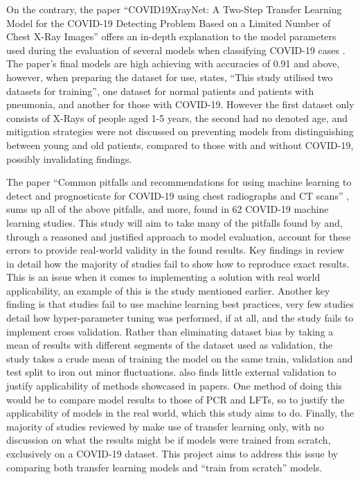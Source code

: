 On the contrary, the paper “COVID19XrayNet: A Two-Step Transfer Learning Model for the COVID-19 Detecting Problem Based on a Limited Number of Chest X-Ray Images” offers an in-depth explanation to the model parameters used during the evaluation of several models when classifying COVID-19 cases \citep{zhang2020covid19xraynet}. The paper’s final models are high achieving with accuracies of 0.91 and above, however, when preparing the dataset for use, \cite{zhang2020covid19xraynet} states, “This study utilised two datasets for training”, one dataset for normal patients and patients with pneumonia, and another for those with COVID-19. However the first dataset only consists of X-Rays of people aged 1-5 years, the second had no denoted age, and mitigation strategies were not discussed on preventing models from distinguishing between young and old patients, compared to those with and without COVID-19, possibly invalidating findings.

The paper “Common pitfalls and recommendations for using machine learning to detect and prognosticate for COVID-19 using chest radiographs and CT scans” \citep{roberts2021common}, sums up all of the above pitfalls, and more, found in 62 COVID-19 machine learning studies. This study will aim to take many of the pitfalls found by \cite{roberts2021common} and, through a reasoned and justified approach to model evaluation, account for these errors to provide real-world validity in the found results. Key findings in \cite{roberts2021common} review in detail how the majority of studies fail to show how to reproduce exact results. This is an issue when it comes to implementing a solution with real world applicability, an example of this is the \cite{bressem2020comparing} study mentioned earlier. Another key finding is that studies fail to use machine learning best practices, very few studies detail how hyper-parameter tuning was performed, if at all, and the \cite{bressem2020comparing} study fails to implement cross validation. Rather than eliminating dataset bias by taking a mean of results with different segments of the dataset used as validation, the study takes a crude mean of training the model on the same train, validation and test split to iron out minor fluctuations. \cite{roberts2021common} also finds little external validation to justify applicability of methods showcased in papers. One method of doing this would be to compare model results to those of PCR and LFTs, so to justify the applicability of models in the real world, which this study aims to do. Finally, the majority of studies reviewed by \cite{roberts2021common} make use of transfer learning only, with no discussion on what the results might be if models were trained from scratch, exclusively on a COVID-19 dataset. This project aims to address this issue by comparing both transfer learning models and “train from scratch” models.

